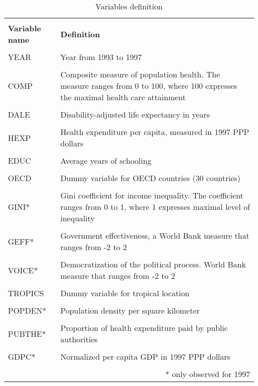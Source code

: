 \documentclass[12pt,a4paper]{article}\usepackage[]{graphicx}\usepackage[]{color}
\begin{document}
\begin{table}[htbp] \centering 

  \caption{Variables definition} 
  \label{tab:var.def} 
  \footnotesize
\begin{tabular}{p{3cm} p{9cm}} 
\\[-1.8ex]\hline 
\hline \\[-1.8ex] 
\textbf{Variable name} & \textbf{Definition} \\ 
\hline \\[-1.8ex] 

YEAR & Year from 1993 to 1997 \\
\hline \\[-1.8ex]
COMP & Composite measure of population health. The measure ranges from 0 to 100, where 100 expresses the maximal health care attainment \\
\hline \\[-1.8ex]
DALE & Disability-adjusted life expectancy in years \\
\hline \\[-1.8ex]
HEXP & Health expenditure per capita, measured in 1997 PPP dollars \\
\hline \\[-1.8ex]
EDUC & Average years of schooling \\
\hline \\[-1.8ex]
OECD & Dummy variable for OECD countries (30 countries) \\
\hline \\[-1.8ex]
GINI* & Gini coefficient for income inequality. The coefficient ranges from 0 to 1, where 1 expresses maximal level of inequality \\
\hline \\[-1.8ex]
GEFF* & Government effectiveness, a World Bank measure that ranges from -2 to 2 \\
\hline \\[-1.8ex]
VOICE* & Democratization of the political process. World Bank measure that ranges from -2 to 2 \\
\hline \\[-1.8ex]
TROPICS & Dummy variable for tropical location \\
\hline \\[-1.8ex]
POPDEN* & Population density per square kilometer \\
\hline \\[-1.8ex]
PUBTHE* & Proportion of health expenditure paid by public authorities \\
\hline \\[-1.8ex]
GDPC* & Normalized per capita GDP in 1997 PPP dollars \\
\hline

\hline \\[-1.8ex] 
&\multicolumn{1}{r}{* only observed for 1997} \\ 
\end{tabular} 
\end{table} 
\normalsize
\end{document}
